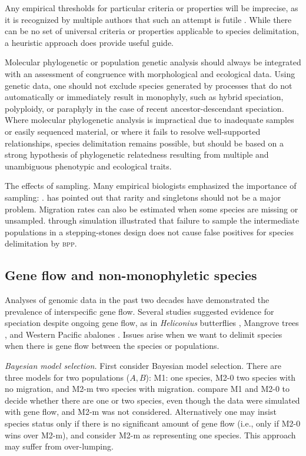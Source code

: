 \documentclass[A4]{article1}
\newcommand{\red}[1]{{\color{red}{#1}}}
\begin{document}
Any empirical thresholds for particular criteria or properties will be imprecise, as it
is recognized by multiple authors that such an attempt is futile \cite{Wells2022}. While
there can be no set of universal criteria or properties applicable to species
delimitation, a heuristic approach does provide useful guide.

Molecular phylogenetic or population genetic analysis should always be integrated with
an assessment of congruence with morphological and ecological data.  Using genetic data,
one should not exclude species generated by processes that do not automatically or
immediately result in monophyly, such as hybrid speciation, polyploidy, or paraphyly in
the case of recent ancestor-descendant speciation.  Where molecular phylogenetic
analysis is impractical due to inadequate samples or easily sequenced material, or where
it fails to resolve well-supported relationships, species delimitation remains possible,
but should be based on a strong hypothesis of phylogenetic relatedness resulting from
multiple and unambiguous phenotypic and ecological traits.

The effects of sampling.  Many empirical biologists emphasized the importance of
sampling: \citet{Chambers2020, Wells2022}.  \cite{Yang2017} has pointed out that rarity
and singletons should not be a major problem. Migration rates can also be estimated when
some species are missing or unsampled. \citet{Zhang2011} through simulation illustrated
that failure to sample the intermediate populations in a stepping-stones design does not
cause false positives for species delimitation by \textsc{bpp}.


\subsection{Gene flow and non-monophyletic species}

Analyses of genomic data in the past two decades have demonstrated the prevalence of
interspecific gene flow.  Several studies suggested evidence for speciation despite
ongoing gene flow, as in \textit{Heliconius} butterflies \citep{Martin2013}, Mangrove
trees \citep{He2019}, and Western Pacific abalones \citep{Hirase2021}.  Issues arise
when we want to delimit species when there is gene flow between the species or
populations.

\textit{Bayesian model selection.}  First consider Bayesian model selection. There are
three models for two populations ($A,B$): M1: one species, M2-0 two species with no
migration, and M2-m two species with migration.  \citet{Leache2019} compare M1 and M2-0 to
decide whether there are one or two species, even though the data were simulated with gene
flow, and M2-m was not considered.  Alternatively one may insist species status only if
there is no significant amount of gene flow (i.e., only if M2-0 wins over M2-m), and
consider M2-m as representing one species.  This approach may suffer from over-lumping. 
\red{[Generate an example.  What about the $ABCDX$ dataset?]}
\end{document}
